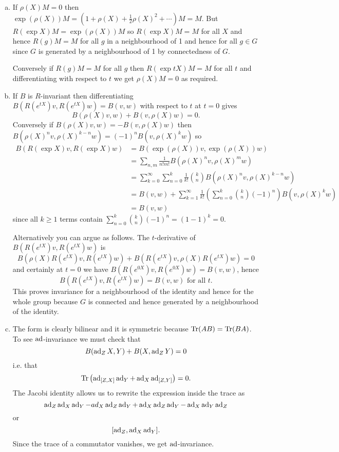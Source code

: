 \documentclass[12pt]{article}
\begin{document}
\begin{answer}
\begin{enumerate}[(a)]
\item If $\rho(X)M=0$ then $\exp(\rho(X))M=(1+\rho(X)+\tfrac{1}{2}\rho(X)^2+\cdots)M=M$. But $R(\exp X)M=\exp(\rho(X))M$ so $R(\exp X)M=M$ for all $X$ and hence $R(g)M=M$ for all $g$ in a neighbourhood of 1 and hence for all $g\in G$ since $G$ is generated by a neighbourhood of 1 by connectedness of $G$.

Conversely if $R(g)M=M$ for all $g$ then $R(\exp tX)M=M$ for all $t$ and differentiating with respect to $t$ we get $\rho(X)M=0$ as required.
\item If $B$ is $R$-invariant then differentiating $B(R(e^{tX})v,R(e^{tX})w)=B(v,w)$ with respect to $t$ at $t=0$ gives
\[B(\rho(X)v,w)+B(v,\rho(X)w)=0.\]
Conversely if $B(\rho(X)v,w)=-B(v,\rho(X)w)$ then $B(\rho(X)^nv,\rho(X)^{k-n}w)=(-1)^nB(v,\rho(X)^kw)$ so
\begin{align*}
B(R(\exp X)v,R(\exp X)w)&=B(\exp(\rho(X))v,\exp(\rho(X))w)\\
&=\sum_{n,m}\frac{1}{n!m!}B(\rho(X)^nv,\rho(X)^mw)\\
&=\sum_{k=0}^{\infty}\sum_{n=0}^k\frac{1}{k!}\binom{k}{n}B(\rho(X)^nv,\rho(X)^{k-n}w)\\
&=B(v,w)+\sum_{k=1}^{\infty}\frac{1}{k!}\left(\sum_{n=0}^k\binom{k}{n}(-1)^n\right)B(v,\rho(X)^kw)\\
&=B(v,w)
\end{align*}
since all $k\geq 1$ terms contain $\sum_{n=0}^k\binom{k}{n}(-1)^n=(1-1)^k=0$.

Alternatively you can argue as follows. The $t$-derivative of $B(R(e^{tX})v,R(e^{tX})w)$ is
\[B(\rho(X)R(e^{tX})v,R(e^{tX})w)+B(R(e^{tX})v,\rho(X)R(e^{tX})w)=0\]
and certainly at $t=0$ we have $B(R(e^{0X})v,R(e^{0X})w)=B(v,w)$, hence
\[B(R(e^{tX})v,R(e^{tX})w)=B(v,w)\mbox{ for all }t.\]
This proves invariance for a neighbourhood of the identity and hence for the whole group because $G$ is connected and hence generated by a neighbourhood of the identity.
\item The form is clearly bilinear and it is symmetric because $\operatorname{Tr}(AB)=\operatorname{Tr}(BA)$. To see $\operatorname{ad}$-invariance we must check that
\[B(\operatorname{ad}_ZX,Y)+B(X,\operatorname{ad}_ZY)=0\]
i.e. that
\[\operatorname{Tr}\left(\operatorname{ad}_{[Z,X]}\operatorname{ad}_Y+\operatorname{ad}_X\operatorname{ad}_{[Z,Y]}\right)=0.\]
The Jacobi identity allows us to rewrite the expression inside the trace as
\[\operatorname{ad}_Z\operatorname{ad}_X\operatorname{ad}_Y-ad_X\operatorname{ad}_Z\operatorname{ad}_Y+\operatorname{ad}_X\operatorname{ad}_Z\operatorname{ad}_Y-\operatorname{ad}_X\operatorname{ad}_Y\operatorname{ad}_Z\]
or
\[[\operatorname{ad}_Z,\operatorname{ad}_X\operatorname{ad}_Y].\]
Since the trace of a commutator vanishes, we get $\operatorname{ad}$-invariance.


\end{enumerate}
\end{answer}
\end{document}
